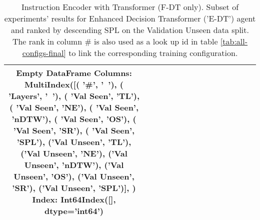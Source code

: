 \begin{table}
\centering
\caption{\label{tab:e_dt_instruction_encoding_full}Instruction Encoder with Transformer (F-DT only). Subset of experiments' results for Enhanced Decision Transformer ('E-DT') agent and ranked by descending SPL on the Validation Unseen data split. The rank in column \# is also used as a look up id in table \ref{tab:all-configs-final} to link the corresponding training configuration.}
\begin{tabular}{@{\hskip3pt}c@{\hskip3pt}c@{\hskip3pt}c@{\hskip3pt}c@{\hskip3pt}c@{\hskip3pt}c@{\hskip3pt}c@{\hskip3pt}c@{\hskip3pt}c@{\hskip3pt}c@{\hskip3pt}c@{\hskip3pt}c@{\hskip3pt}c@{\hskip3pt}c@{\hskip3pt}c}
\toprule
Empty DataFrame
Columns: MultiIndex([(        '\textbf{\#}',    '\textbf{~}'),
            (    '\textbf{Layers}',    '\textbf{~}'),
            (  '\textbf{Val Seen}',   '\textbf{TL}'),
            (  '\textbf{Val Seen}',   '\textbf{NE}'),
            (  '\textbf{Val Seen}', '\textbf{nDTW}'),
            (  '\textbf{Val Seen}',   '\textbf{OS}'),
            (  '\textbf{Val Seen}',   '\textbf{SR}'),
            (  '\textbf{Val Seen}',  '\textbf{SPL}'),
            ('\textbf{Val Unseen}',   '\textbf{TL}'),
            ('\textbf{Val Unseen}',   '\textbf{NE}'),
            ('\textbf{Val Unseen}', '\textbf{nDTW}'),
            ('\textbf{Val Unseen}',   '\textbf{OS}'),
            ('\textbf{Val Unseen}',   '\textbf{SR}'),
            ('\textbf{Val Unseen}',  '\textbf{SPL}')],
           )
Index: Int64Index([], dtype='int64') \\
\bottomrule
\end{tabular}
\end{table}
